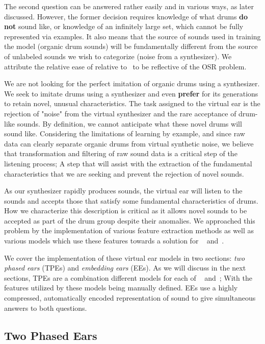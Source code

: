 \documentclass[\main/thesis.tex]{subfiles}
\begin{document}
The second question can be answered rather easily and in various ways, as later discussed. However, the former decision requires knowledge of what drums \textbf{do not} sound like, or knowledge of an infinitely large set, which cannot be fully represented via examples. It also means that the source of sounds used in training the model (organic drum sounds) will be fundamentally different from the source of unlabeled sounds we wish to categorize (noise from a synthesizer). We attribute the relative ease of  relative to~ to be reflective of the OSR problem. 

We are not looking for the perfect imitation of organic drums using a synthesizer. We seek to imitate drums using a synthesizer and even \textbf{prefer} for its generations to retain novel, unusual characteristics. The task assigned to the virtual ear is the rejection of "noise" from the virtual synthesizer and the rare acceptance of drum-like sounds. By definition, we cannot anticipate what these novel drums will sound like. Considering the limitations of learning by example, and since raw data can clearly separate organic drums from virtual synthetic noise, we believe that transformation and filtering of raw sound data is a critical step of the listening process; A step that will assist with the extraction of the fundamental characteristics that we are seeking and prevent the rejection of novel sounds.

As our synthesizer rapidly produces sounds, the virtual ear will listen to the sounds and accepts those that satisfy some fundamental characteristics of drums. How we characterize this description is critical as it allows novel sounds to be accepted as part of the drum group despite their anomalies. We approached this problem by the implementation of various feature extraction methods as well as various models which use these features towards a solution for ~ and~.

We cover the implementation of these virtual ear models in two sections: \emph{two phased ears} (TPEs) and \emph{embedding ears} (EEs). As we will discuss in the next sections, TPEs are a combination different models for each of ~ and~; With the features utilized by these models being manually defined. EEs use a highly compressed, automatically encoded representation of sound to give simultaneous answers to both questions.

\subsection{Two Phased Ears}
\label{sec:ear}
\end{document}
